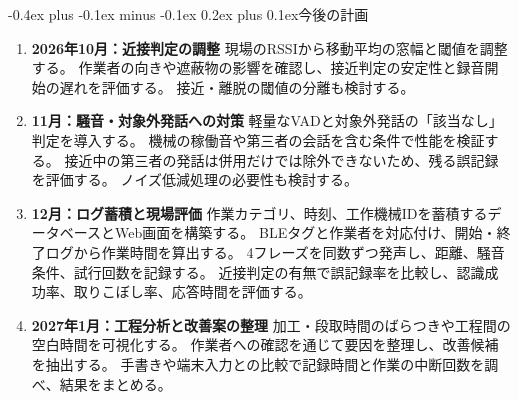 \documentclass[a4paper,10pt,twocolumn,ja=standard,lualatex,geometry=user]{bxjsarticle}
\makeatletter
\renewcommand{\section}{\@startsection{section}{1}{\z@}%
  {-0.4ex plus -0.1ex minus -0.1ex}%
  {0.2ex plus 0.1ex}{\normalfont\large\bfseries}}
\makeatother
\begin{document}
\section{今後の計画}
\begin{enumerate}
  \item \textbf{2026年10月：近接判定の調整}\quad
  現場のRSSIから移動平均の窓幅と閾値を調整する。
  作業者の向きや遮蔽物の影響を確認し、接近判定の安定性と録音開始の遅れを評価する。
  接近・離脱の閾値の分離も検討する。

  \item \textbf{11月：騒音・対象外発話への対策}\quad
  軽量なVADと対象外発話の「該当なし」判定を導入する。
  機械の稼働音や第三者の会話を含む条件で性能を検証する。
  接近中の第三者の発話は併用だけでは除外できないため、残る誤記録を評価する。
  ノイズ低減処理の必要性も検討する。

  \item \textbf{12月：ログ蓄積と現場評価}\quad
  作業カテゴリ、時刻、工作機械IDを蓄積するデータベースとWeb画面を構築する。
  BLEタグと作業者を対応付け、開始・終了ログから作業時間を算出する。
  4フレーズを同数ずつ発声し、距離、騒音条件、試行回数を記録する。
  近接判定の有無で誤記録率を比較し、認識成功率、取りこぼし率、応答時間を評価する。

  \item \textbf{2027年1月：工程分析と改善案の整理}\quad
  加工・段取時間のばらつきや工程間の空白時間を可視化する。
  作業者への確認を通じて要因を整理し、改善候補を抽出する。
  手書きや端末入力との比較で記録時間と作業の中断回数を調べ、結果をまとめる。
\end{enumerate}

\nocite{kawahara2016,onishi2018}
\begingroup
\small


\endgroup
\end{document}

